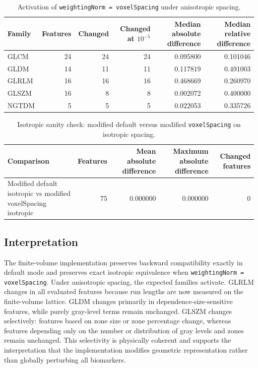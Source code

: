 \begin{table}[htbp]
\centering
\caption{Activation of \texttt{weightingNorm = voxelSpacing} under anisotropic spacing.}
\begin{tabular}{lrrrrr}
\hline
Family & Features & Changed & Changed at $10^{-5}$ & Median absolute difference & Median relative difference \\
\hline
GLCM  & 24 & 24 & 24 & 0.095800 & 0.101046 \\
GLDM  & 14 & 11 & 11 & 0.117819 & 0.491003 \\
GLRLM & 16 & 16 & 16 & 0.468669 & 0.260970 \\
GLSZM & 16 &  8 &  8 & 0.002072 & 0.400000 \\
NGTDM &  5 &  5 &  5 & 0.022053 & 0.335726 \\
\hline
\end{tabular}
\end{table}

\begin{table}[htbp]
\centering
\caption{Isotropic sanity check: modified default versus modified \texttt{voxelSpacing} on isotropic spacing.}
\begin{tabular}{lrrrr}
\hline
Comparison & Features & Mean absolute difference & Maximum absolute difference & Changed features \\
\hline
Modified default isotropic vs modified voxelSpacing isotropic & 75 & 0.000000 & 0.000000 & 0 \\
\hline
\end{tabular}
\end{table}

\subsection{Interpretation}

The finite-volume implementation preserves backward compatibility exactly in default mode and preserves exact
isotropic equivalence when \texttt{weightingNorm = voxelSpacing}. Under anisotropic spacing, the expected families
activate. GLRLM changes in all evaluated features because run lengths are now measured on the finite-volume lattice.
GLDM changes primarily in dependence-size-sensitive features, while purely gray-level terms remain unchanged. GLSZM
changes selectively: features based on zone size or zone percentage change, whereas features depending only on the
number or distribution of gray levels and zones remain unchanged. This selectivity is physically coherent and supports
the interpretation that the implementation modifies geometric representation rather than globally perturbing all
biomarkers.

